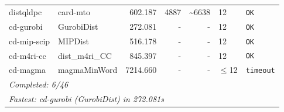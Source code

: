 \begin{longtable}{llrrrl p{}}
distqldpc & card-mto & 602.187 & 4887 & \textasciitilde{}6638 & 12 & \texttt{OK} \\
cd-gurobi & GurobiDist & 272.081 & - & - & 12 & \texttt{OK} \\
cd-mip-scip & MIPDist & 516.178 & - & - & 12 & \texttt{OK} \\
cd-m4ri-cc & dist\_m4ri\_CC & 845.397 & - & - & 12 & \texttt{OK} \\
cd-magma & magmaMinWord & 7214.660 & - & - & $\leq$12 & \texttt{timeout} \\
\midrule
\multicolumn{7}{l}{\textit{Completed: 6/46}} \\
\multicolumn{7}{l}{\textit{Fastest: cd-gurobi (GurobiDist) in 272.081s}} \\
\end{longtable}
